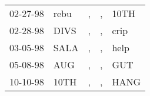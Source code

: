 \begin{supertabular}{lllll}
 02-27-98 &  rebu &  , &  , &  10TH \\
 02-28-98 &  DIVS &  , &  , &  crip \\
 03-05-98 &  SALA &  , &  , &  help \\
 05-08-98 &   AUG &  , &  , &   GUT \\
 10-10-98 &  10TH &  , &  , &  HANG \\
\end{supertabular}
